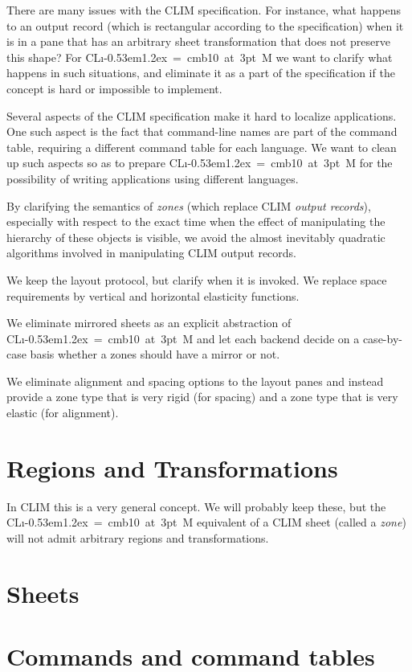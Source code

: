 \documentclass{report}
\def\Tiny{ \font\Tinyfont = cmb10 at 3pt \relax  \Tinyfont}
\def\clim{\textsf{CL{\i}\kern-0.53em\raise1.2ex\hbox{\Tiny 3}M}}
\def\climtwo{CLIM\thinspace{\small II}}
\begin{document}
There are many issues with the \climtwo{} specification.  For
instance, what happens to an output record (which is rectangular
according to the specification) when it is in a pane that has an
arbitrary sheet transformation that does not preserve this shape?  For
\clim{} we want to clarify what happens in such situations, and
eliminate it as a part of the specification if the concept is hard or
impossible to implement. 

Several aspects of the \climtwo{} specification make it hard to
localize applications.  One such aspect is the fact that command-line
names are part of the command table, requiring a different command
table for each language.  We want to clean up such aspects so as to
prepare \clim{} for the possibility of writing applications using
different languages. 

By clarifying the semantics of \emph{zones} (which replace \climtwo{}
\emph{output records}), especially with respect to the exact time when
the effect of manipulating the hierarchy of these objects is visible,
we avoid the almost inevitably quadratic algorithms involved in
manipulating \climtwo{} output records. 

We keep the layout protocol, but clarify when it is invoked.  We
replace space requirements by vertical and horizontal elasticity
functions. 

We eliminate mirrored sheets as an explicit abstraction of \clim{} and
let each backend decide on a case-by-case basis whether a zones should
have a mirror or not.

We eliminate alignment and spacing options to the layout panes and
instead provide a zone type that is very rigid (for spacing) and a
zone type that is very elastic (for alignment).

\section{Regions and Transformations}

In \climtwo{} this is a very general concept.  We will probably keep
these, but the \clim{} equivalent of a \climtwo{} sheet (called a
\emph{zone}) will not admit arbitrary regions and transformations. 

\section{Sheets}

\section{Commands and command tables}
\end{document}
